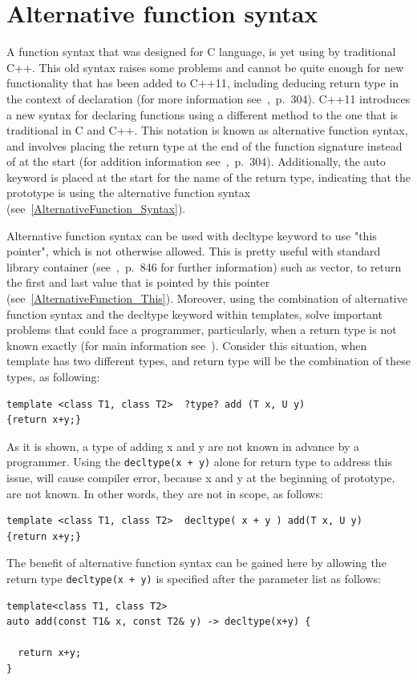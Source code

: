 \documentclass[11pt]{report}
\begin{document}
\section{Alternative function syntax}
\label{section: Alternative function syntax}
A function syntax that was designed for C language, is yet using by traditional C++. This old syntax raises some problems and cannot be quite enough for new functionality that has been added to C++11, including deducing return type in the context of declaration (for more information see~\cite{Gregorie:professionalcpp},~p.~304). C++11 introduces a new syntax for declaring functions using a different method to the one that is traditional in C and C++. This notation is known as alternative function syntax, and involves placing the return type at the end of the function signature instead of at the start (for addition information see~\cite{Gregorie:professionalcpp},~p.~304). Additionally, the auto keyword is placed at the start for the name of the return type, indicating that the prototype is using the alternative function syntax (see~\ref{AlternativeFunction_Syntax}).

Alternative function syntax can be used with decltype keyword to use "this pointer", which is not otherwise allowed. This is pretty useful with standard library container (see~\cite{ISO:2011:Cpplanguage},~p.~846 for further information) such as vector, to return the first and last value that is pointed by this pointer (see~\ref{AlternativeFunction_This}). Moreover, using the combination of alternative function syntax and the decltype keyword within templates, solve important problems that could face a programmer, particularly, when a return type is not known exactly (for main information see~\cite{Stroustrup:2012:Cpp11}). Consider this situation, when template has two different types, and return type will be the combination of these types, as following:
\begin{lstlisting}
template <class T1, class T2>  ?type? add (T x, U y) 
{return x+y;}
\end{lstlisting}
As it is shown, a type of adding x and y are not known in advance by a programmer. Using the \texttt{decltype(x + y)} alone for return type to address this issue, will cause compiler error, because x and y at the beginning of prototype, are not known. In other words, they are not in scope, as follows:
\begin{lstlisting}
template <class T1, class T2>  decltype( x + y ) add(T x, U y)
{return x+y;}
\end{lstlisting}
The benefit of alternative function syntax can be gained here by allowing the return type \texttt{decltype(x + y)} is specified after the parameter list as follows:
\begin{lstlisting}
template<class T1, class T2>
auto add(const T1& x, const T2& y) -> decltype(x+y) {

  return x+y;
}
\end{lstlisting}
\end{document}
